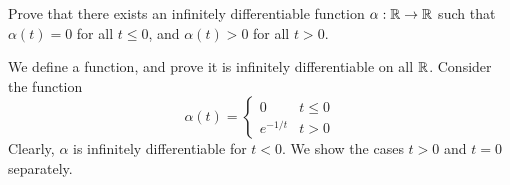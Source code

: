 \documentclass{article}
\begin{document}
\newpage
{}

\begin{qu}
    Prove that there exists an infinitely differentiable function
    $ \alpha: \mathbb{R} \rightarrow \mathbb{R} $ such that $ \alpha(t) = 0 $ for all
    $ t \leq 0 $, and $ \alpha(t) > 0 $ for all $ t > 0 $.
\end{qu}

\begin{soln}
    We define a function, and prove it is infinitely differentiable on all $ \mathbb{R} $.
    Consider the function
    \begin{equation*}
        \alpha(t) = \begin{cases} 0 & t \leq 0 \\ e^{-1/t} & t > 0 \end{cases}
    \end{equation*}
    Clearly, $ \alpha $ is infinitely differentiable for $ t < 0 $.
    We show the cases $ t > 0 $ and $ t = 0 $ separately. \npgh


\end{soln}
\end{document}
